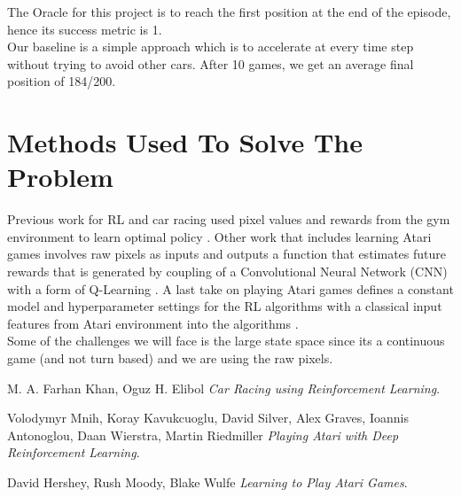 \documentclass[10pt,twocolumn,letterpaper]{article}
\begin{document}
The Oracle for this project is to reach the first position at the end of the episode, hence its success metric is 1.\\

Our baseline is a simple approach which is to accelerate at every time step without trying to avoid other cars. After 10 games, we get an average final position of 184/200.

\section*{Methods Used To Solve The Problem}

Previous work for RL and car racing used pixel values and rewards from the gym environment to learn optimal policy \cite{Car-Racing}. Other work that includes learning Atari games involves raw pixels as inputs and outputs a function that estimates future rewards that is generated by coupling of a Convolutional Neural Network (CNN) with a form of Q-Learning \cite{DeepMind}. A last take on playing Atari games defines a constant model and hyperparameter settings for the RL algorithms with a classical input features from Atari environment into the algorithms \cite{HyperParam}. \\

Some of the challenges we will face is the large state space since its a continuous game (and not turn based) and we are using the raw pixels.

\begin{thebibliography}{9}
M. A. Farhan Khan, Oguz H. Elibol
\textit{Car Racing using Reinforcement Learning}. 

 
Volodymyr Mnih, Koray Kavukcuoglu, David Silver, Alex Graves, Ioannis Antonoglou,
Daan Wierstra, Martin Riedmiller
\textit{Playing Atari with Deep Reinforcement Learning}. 


David Hershey, Rush Moody, Blake Wulfe
\textit{Learning to Play Atari Games}. 

\end{thebibliography}
\end{document}
